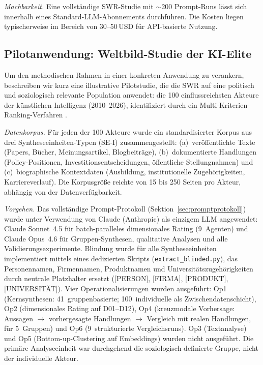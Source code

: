 \documentclass[11pt,a4paper]{article}
\theoremstyle{definition}
\theoremstyle{plain}
\theoremstyle{remark}
\begin{document}
\emph{Machbarkeit.} Eine vollst\"andige SWR-Studie mit $\sim$200 Prompt-Runs l\"asst sich innerhalb eines Standard-LLM-Abonnements durchf\"uhren. Die Kosten liegen typischerweise im Bereich von 30--50\,USD f\"ur API-basierte Nutzung.


\subsection{Pilotanwendung: Weltbild-Studie der KI-Elite}
\label{sec:pilot}

Um den methodischen Rahmen in einer konkreten Anwendung zu verankern, beschreiben wir kurz eine illustrative Pilotstudie, die die SWR auf eine politisch und soziologisch relevante Population anwendet: die 100 einflussreichsten Akteure der k\"unstlichen Intelligenz (2010--2026), identifiziert durch ein Multi-Kriterien-Ranking-Verfahren \citep{Geiger2026Elite}.

\emph{Datenkorpus.} F\"ur jeden der 100 Akteure wurde ein standardisierter Korpus aus drei Syntheseeinheiten-Typen (SE-I) zusammengestellt: (a)~ver\"offentlichte Texte (Papers, B\"ucher, Meinungsartikel, Blogbeitr\"age), (b)~dokumentierte Handlungen (Policy-Positionen, Investitionsentscheidungen, \"offentliche Stellungnahmen) und (c)~biographische Kontextdaten (Ausbildung, institutionelle Zugeh\"origkeiten, Karriereverlauf). Die Korpusgr\"o\ss{}e reichte von 15 bis 250 Seiten pro Akteur, abh\"angig von der Datenverf\"ugbarkeit.

\emph{Vorgehen.} Das vollst\"andige Prompt-Protokoll (Sektion~\ref{sec:promptprotokoll}) wurde unter Verwendung von Claude (Anthropic) als einzigem LLM angewendet: Claude Sonnet~4.5 f\"ur batch-paralleles dimensionales Rating (9~Agenten) und Claude Opus~4.6 f\"ur Gruppen-Synthesen, qualitative Analysen und alle Validierungsexperimente. Blindung wurde f\"ur alle Syntheseeinheiten implementiert mittels eines dedizierten Skripts (\texttt{extract\_blinded.py}), das Personennamen, Firmennamen, Produktnamen und Universit\"atszugeh\"origkeiten durch neutrale Platzhalter ersetzt ([PERSON], [FIRMA], [PRODUKT], [UNIVERSIT\"AT]). Vier Operationalisierungen wurden ausgef\"uhrt: Op1 (Kernsynthesen: 41~gruppenbasierte; 100~individuelle als Zwischendatenschicht), Op2 (dimensionales Rating auf D01--D12), Op4 (kreuzmodale Vorhersage: Aussagen $\to$ vorhergesagte Handlungen $\to$ Vergleich mit realen Handlungen, f\"ur 5~Gruppen) und Op6 (9~strukturierte Vergleichsruns). Op3 (Textanalyse) und Op5 (Bottom-up-Clustering auf Embeddings) wurden nicht ausgef\"uhrt. Die prim\"are Analyseeinheit war durchgehend die soziologisch definierte Gruppe, nicht der individuelle Akteur.
\end{document}
